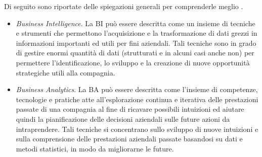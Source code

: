 Di seguito sono riportate delle spiegazioni generali per comprenderle meglio \cite{academiaedu_bi_and_ba}.

\begin{itemize}
    \item \textit{Business Intelligence}. La BI può essere descritta come un insieme di tecniche e strumenti che permettono l'acquisizione e la trasformazione di dati grezzi in informazioni importanti ed utili per fini aziendali. Tali tecniche sono in grado di gestire enormi quantità di dati (strutturati e in alcuni casi anche non) per permettere l'identificazione, lo sviluppo e la creazione di nuove opportunità strategiche utili alla compagnia.
    \item \textit{Business Analytics}. La BA può essere descritta come l'insieme di competenze, tecnologie e pratiche atte all'esplorazione continua e iterativa delle prestazioni passate di una compagnia al fine di ricavare possibili intuizioni ed aiutare quindi la pianificazione delle decisioni aziendali sulle future azioni da intraprendere. Tali tecniche si concentrano sullo sviluppo di nuove intuizioni e sulla comprensione delle prestazioni aziendali passate basandosi su dati e metodi statistici, in modo da migliorarne le future.
\end{itemize}